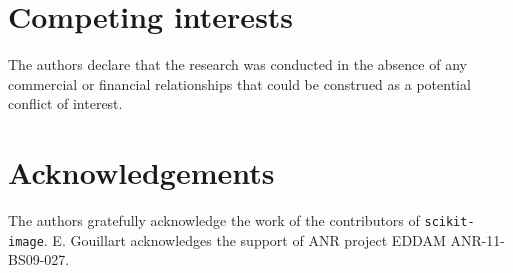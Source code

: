 \documentclass[twocolumn]{bmcart}%
\begin{document}

\begin{backmatter}

\section*{Competing interests}
The authors declare that the research was conducted
in the absence of any commercial or financial relationships that could be
construed as a potential conflict of interest.

\section*{Acknowledgements}
  
The authors gratefully acknowledge the work of the contributors of
  \texttt{scikit-image}. E. Gouillart acknowledges the support of ANR
  project EDDAM ANR-11-BS09-027.


\nocite{label}



\end{backmatter}
\end{document}
